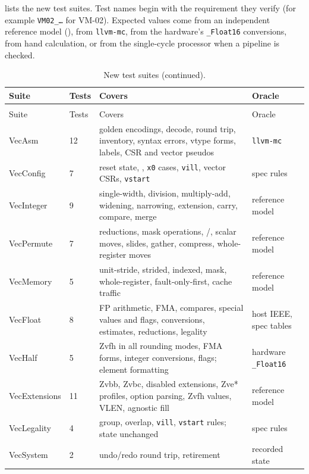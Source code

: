 \documentclass[11pt]{article}
\begin{document}
 lists the new test suites. Test names begin with the requirement they verify
(for example \texttt{VM02\_\ldots} for VM-02). Expected values come from an independent
reference model (), from \texttt{llvm-mc}, from the hardware's
\texttt{\_Float16} conversions, from hand calculation, or from the single-cycle processor when a
pipeline is checked.

\small
\begin{longtable}{@{}L{3.4cm}L{1.0cm}L{6.9cm}L{2.7cm}@{}}
\caption{New test suites (\texttt{test/vector/}, \texttt{test/rv5s\_regression\_test.cpp}).}\label{tab:suites}\\
\toprule
Suite & Tests & Covers & Oracle \\
\midrule
\endfirsthead
\caption[]{New test suites (continued).}\\
\toprule
Suite & Tests & Covers & Oracle \\
\midrule
\endhead
VecAsm & 12 & golden encodings, decode, round trip, inventory, syntax errors, vtype forms, labels, CSR and vector pseudos & \texttt{llvm-mc} \\
VecConfig & 7 & reset state, , \texttt{x0} cases, \texttt{vill}, vector CSRs, \texttt{vstart} & spec rules \\
VecInteger & 9 & single-width, division, multiply-add, widening, narrowing, extension, carry, compare, merge & reference model \\
VecPermute & 7 & reductions, mask operations, /, scalar moves, slides, gather, compress, whole-register moves & reference model \\
VecMemory & 5 & unit-stride, strided, indexed, mask, whole-register, fault-only-first, cache traffic & reference model \\
VecFloat & 8 & FP arithmetic, FMA, compares, special values and flags, conversions, estimates, reductions, legality & host IEEE, spec tables \\
VecHalf & 5 & Zvfh in all rounding modes, FMA forms, integer conversions, flags; element formatting & hardware \texttt{\_Float16} \\
VecExtensions & 11 & Zvbb, Zvbc, disabled extensions, Zve* profiles, option parsing, Zvfh values, VLEN, agnostic fill & reference model \\
VecLegality & 4 & group, overlap, \texttt{vill}, \texttt{vstart} rules; state unchanged & spec rules \\
VecSystem & 2 & undo/redo round trip, retirement & recorded state \\

\end{longtable}
\end{document}
